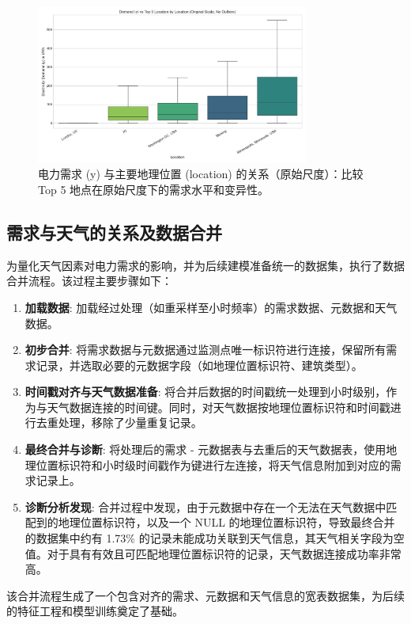 \documentclass{article} %
\begin{document}
\begin{figure}[H]
    \centering
    \includegraphics[width=0.8\textwidth]{../plots/demand_vs_top5_location_boxplot_orig.png}
    \caption{电力需求 (y) 与主要地理位置 (location) 的关系（原始尺度）：比较 Top 5 地点在原始尺度下的需求水平和变异性。} %
    \label{fig:demand_vs_location_orig}
\end{figure}

\subsection{需求与天气的关系及数据合并}
\label{subsec:demand_weather}

为量化天气因素对电力需求的影响，并为后续建模准备统一的数据集，执行了数据合并流程。该过程主要步骤如下：
\begin{enumerate}
    \item \textbf{加载数据}: 加载经过处理（如重采样至小时频率）的需求数据、元数据和天气数据。
    \item \textbf{初步合并}: 将需求数据与元数据通过监测点唯一标识符进行连接，保留所有需求记录，并选取必要的元数据字段（如地理位置标识符、建筑类型）。
    \item \textbf{时间戳对齐与天气数据准备}: 将合并后数据的时间戳统一处理到小时级别，作为与天气数据连接的时间键。同时，对天气数据按地理位置标识符和时间戳进行去重处理，移除了少量重复记录。
    \item \textbf{最终合并与诊断}: 将处理后的需求 - 元数据表与去重后的天气数据表，使用地理位置标识符和小时级时间戳作为键进行左连接，将天气信息附加到对应的需求记录上。
    \item \textbf{诊断分析发现}: 合并过程中发现，由于元数据中存在一个无法在天气数据中匹配到的地理位置标识符，以及一个 NULL 的地理位置标识符，导致最终合并的数据集中约有 1.73\% 的记录未能成功关联到天气信息，其天气相关字段为空值。对于具有有效且可匹配地理位置标识符的记录，天气数据连接成功率非常高。
\end{enumerate}
该合并流程生成了一个包含对齐的需求、元数据和天气信息的宽表数据集，为后续的特征工程和模型训练奠定了基础。
\end{document}
